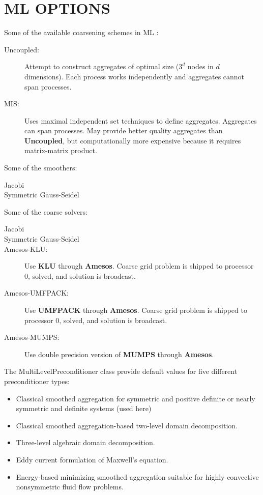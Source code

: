\chapter[ ]{\uppercase{ML options}}

Some of the available coarsening schemes in ML \cite{ml_guide}:
\begin{description}
  \item[Uncoupled:] Attempt to construct aggregates of optimal size ($3^d$
    nodes in $d$ dimensions). Each process works independently and aggregates
    cannot span processes.
  \item[MIS:] Uses maximal independent set techniques to define aggregates.
    Aggregates can span processes. May provide better quality aggregates than
    {\bf Uncoupled}, but computationally more expensive because it requires
    matrix-matrix product.
\end{description}
Some of the smoothers:
\begin{description}
  \item[Jacobi]
  \item[Symmetric Gauss-Seidel]
\end{description}
Some of the coarse solvers:
\begin{description}
  \item[Jacobi]
  \item[Symmetric Gauss-Seidel]
  \item[Amesos-KLU:] Use {\bf KLU} through {\bf Amesos}. Coarse grid problem
    is shipped to processor 0, solved, and solution is broadcast.
  \item[Amesos-UMFPACK:] Use {\bf UMFPACK} through {\bf Amesos}. Coarse grid
    problem is shipped to processor 0, solved, and solution is broadcast.
  \item[Amesos-MUMPS:] Use double precision version of {\bf MUMPS} through
    {\bf Amesos}.
\end{description}
The MultiLevelPreconditioner class provide default values for five different
preconditioner types:
\begin{itemize}
  \item Classical smoothed aggregation for symmetric and positive definite or
    nearly symmetric and definite systems (used here)
  \item Classical smoothed aggregation-based two-level domain decomposition.
  \item Three-level algebraic domain decomposition.
  \item Eddy current formulation of Maxwell's equation.
  \item Energy-based minimizing smoothed aggregation suitable for highly
    convective nonsymmetric fluid flow problems.
\end{itemize}
